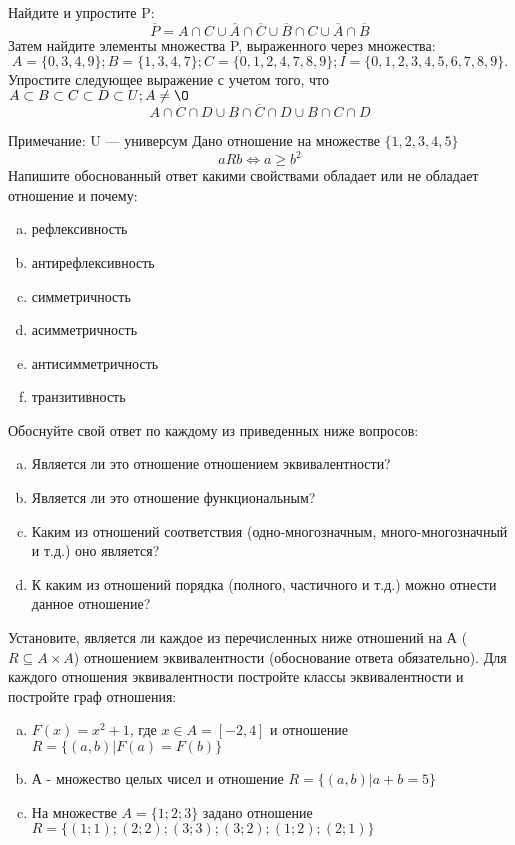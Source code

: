 \documentclass[10pt]{exam}
\begin{document}
\begin{questions}
\question
Найдите и упростите P:
\begin{equation*}
\overline{P} = A \cap C \cup \overline{A} \cap \overline{C} \cup \overline{B} \cap C \cup \overline{A} \cap \overline{B}
\end{equation*}
Затем найдите элементы множества P, выраженного через множества:
\begin{equation*}
A = \{0, 3, 4, 9\}; 
B = \{1, 3, 4, 7\};
C = \{0, 1, 2, 4, 7, 8, 9\};
I = \{0, 1, 2, 3, 4, 5, 6, 7, 8, 9\}.
\end{equation*}\question
Упростите следующее выражение с учетом того, что $A\subset B \subset C \subset D \subset U; A \neq \O$
\begin{equation*}
A \cap C  \cap D \cup B \cap \overline{C} \cap D \cup B \cap C \cap D
\end{equation*}

Примечание: U — универсум\question
Дано отношение на множестве $\{1, 2, 3, 4, 5\}$ 
\begin{equation*}
aRb \iff a \geq b^2
\end{equation*}
Напишите обоснованный ответ какими свойствами обладает или не обладает отношение и почему:   
\begin{enumerate} [a)]\setcounter{enumi}{0}
\item рефлексивность
\item антирефлексивность
\item симметричность
\item асимметричность
\item антисимметричность
\item транзитивность
\end{enumerate}

Обоснуйте свой ответ по каждому из приведенных ниже вопросов:
\begin{enumerate} [a)]\setcounter{enumi}{0}
    \item Является ли это отношение отношением эквивалентности?
    \item Является ли это отношение функциональным?
    \item Каким из отношений соответствия (одно-многозначным, много-многозначный и т.д.) оно является?
    \item К каким из отношений порядка (полного, частичного и т.д.) можно отнести данное отношение?
\end{enumerate}


\question
Установите, является ли каждое из перечисленных ниже отношений на А ($R \subseteq A \times A$) отношением эквивалентности (обоснование ответа обязательно). Для каждого отношения эквивалентности постройте классы эквивалентности и постройте граф отношения:
\begin{enumerate} [a)]\setcounter{enumi}{0}
\item $F(x)=x^{2}+1$, где $x \in A = [-2, 4]$ и отношение $R = \{(a,b)|F(a) = F(b)\}$
\item А - множество целых чисел и отношение $R = \{(a,b)|a + b = 5\}$
\item На множестве $A = \{1; 2; 3\}$ задано отношение $R = \{(1; 1); (2; 2); (3; 3); (3; 2); (1; 2); (2; 1)\}$


\end{enumerate}
\end{questions}
\end{document}
